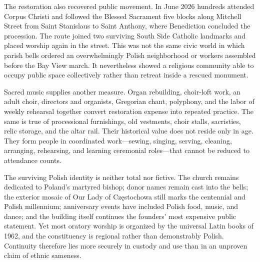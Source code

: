 The restoration also recovered public movement. In June 2026 hundreds attended Corpus Christi and followed the Blessed Sacrament five blocks along Mitchell Street from Saint Stanislaus to Saint Anthony, where Benediction concluded the procession. The route joined two surviving South Side Catholic landmarks and placed worship again in the street. This was not the same civic world in which parish bells ordered an overwhelmingly Polish neighborhood or workers assembled before the Bay View march. It nevertheless showed a religious community able to occupy public space collectively rather than retreat inside a rescued monument.

Sacred music supplies another measure. Organ rebuilding, choir-loft work, an adult choir, directors and organists, Gregorian chant, polyphony, and the labor of weekly rehearsal together convert restoration expense into repeated practice. The same is true of processional furnishings, old vestments, choir stalls, sacristies, relic storage, and the altar rail. Their historical value does not reside only in age. They form people in coordinated work---sewing, singing, serving, cleaning, arranging, rehearsing, and learning ceremonial roles---that cannot be reduced to attendance counts.


The surviving Polish identity is neither total nor fictive. The church remains dedicated to Poland's martyred bishop; donor names remain cast into the bells; the exterior mosaic of Our Lady of Cz\k{e}stochowa still marks the centennial and Polish millennium; anniversary events have included Polish food, music, and dance; and the building itself continues the founders' most expensive public statement. Yet most oratory worship is organized by the universal Latin books of 1962, and the constituency is regional rather than demonstrably Polish. Continuity therefore lies more securely in custody and use than in an unproven claim of ethnic sameness.

